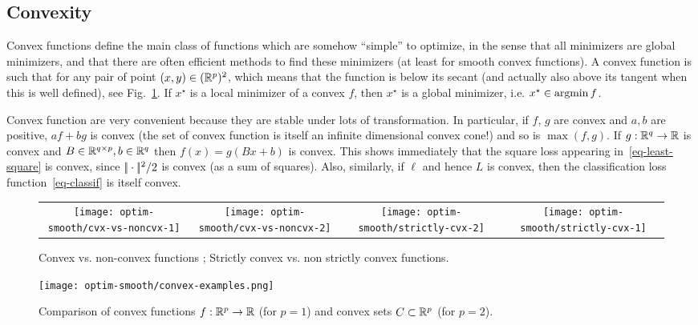 \subsection{Convexity}

Convex functions define the main class of functions which are somehow ``simple'' to optimize, in the sense that all minimizers are global minimizers, and that there are often efficient methods to find these minimizers (at least for smooth convex functions). A convex function is such that for any pair of point $(x,y) \in (\mathbb{R}^p)^2$, 
which means that the function is below its secant (and actually also above its tangent when this is well defined), see Fig.~\ref{fig-cvx-vs-noncvx}. 
%
If $x^\star$ is a local minimizer of a convex $f$, then $x^\star$ is a global minimizer, i.e. $x^\star \in \operatorname{argmin} f$.  


Convex function are very convenient because they are stable under lots of transformation. In particular, if $f$, $g$ are convex and $a, b$ are positive, $a f + b g$ is convex (the set of convex function is itself an infinite dimensional convex cone!) and so is $\max(f,g)$. If $g : \mathbb{R}^q \rightarrow \mathbb{R}$ is convex and $B \in \mathbb{R}^{q \times p}, b \in \mathbb{R}^q$ then $f(x) = g(B x+b)$ is convex. 
%
This shows immediately that the square loss appearing in~\eqref{eq-least-square} is convex, since $|\!| \cdot |\!|^2/2$ is convex (as a sum of squares). 
%
Also, similarly, if $\ell$ and hence $L$ is convex, then the classification loss function~\eqref{eq-classif} is itself convex. 

\begin{figure}
\centering
\begin{tabular}{cccc}
\texttt{[image: optim-smooth/cvx-vs-noncvx-1]} &
\texttt{[image: optim-smooth/cvx-vs-noncvx-2]} &
\texttt{[image: optim-smooth/strictly-cvx-2]} &
\texttt{[image: optim-smooth/strictly-cvx-1]} 
\end{tabular}
\caption{\label{fig-cvx-vs-noncvx}
Convex vs. non-convex functions ; Strictly convex vs. non strictly convex functions.
}
\end{figure}



\begin{figure}
\centering
\texttt{[image: optim-smooth/convex-examples.png]} 
\caption{\label{fig-cvx-set}
Comparison of convex functions $f : \mathbb{R}^p \rightarrow \mathbb{R}$ (for $p=1$) and convex sets $C \subset \mathbb{R}^p$ (for $p=2$).
}
\end{figure}

